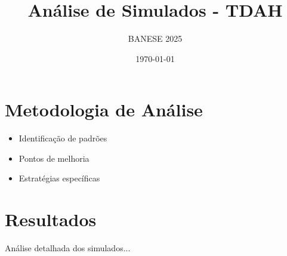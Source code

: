 \documentclass[12pt,a4paper]{article}
\title{Análise de Simulados - TDAH}
\author{BANESE 2025}
\date{\today}
\begin{document}
\maketitle

\section{Metodologia de Análise}
\begin{itemize}
    \item Identificação de padrões
    \item Pontos de melhoria
    \item Estratégias específicas
\end{itemize}

\section{Resultados}
Análise detalhada dos simulados...
\end{document}
